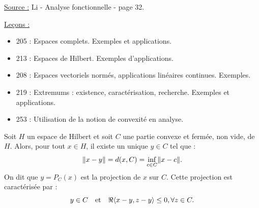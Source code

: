 
\newcommand{\ort}{^{\perp}}

\pagestyle{fancy}

\fancyhead[R]{}



\underline{Source :} Li - Analyse fonctionnelle - page 32.

\underline{Leçons :}
\begin{itemize}
\item  205 : Espaces complets. Exemples et applications.
\item  213 : Espaces de Hilbert. Exemples d’applications.
\item  208 : Espaces vectoriels normés, applications linéaires continues. Exemples.
\item  219 : Extremums : existence, caractérisation, recherche. Exemples et applications.
\item  253 : Utilisation de la notion de convexité en analyse.

\end{itemize}

\begin{thm}
Soit $H$ un espace de Hilbert et soit $C$ une partie convexe et fermée, non vide, de $H$. 
Alors, pour tout $x \in H$, il existe un unique $y \in C$ tel que :
\[ \lVert x-y\rVert = d(x,C) = \inf_{c \in C} \lVert x-c\rVert . \]
On dit que $y=P_C(x)$ est la projection de $x$ sur $C$. Cette projection est caractérisée par :
\[ y \in C \quad \text{et} \quad \Re{\langle x-y, z-y\rangle \leq 0}, \forall z \in C . \]
\end{thm}

